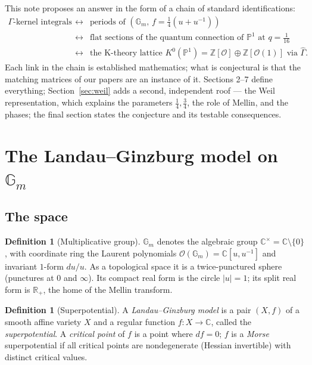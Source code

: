 \documentclass[11pt]{article}
\theoremstyle{definition}
\newtheorem{definition}[proposition]{Definition}
\theoremstyle{remark}
\newcommand{\R}{\mathbb{R}}
\newcommand{\C}{\mathbb{C}}
\newcommand{\Z}{\mathbb{Z}}
\newcommand{\Gm}{\mathbb{G}_m}
\newcommand{\PP}{\mathbb{P}}
\newcommand{\G}{\Gamma}
\begin{document}
This note proposes an answer in the form of a chain of standard
identifications:
\[
  \begin{array}{ccc}
  \text{$\G$-kernel integrals}
  & \longleftrightarrow &
  \text{periods of } (\Gm,\, f = \tfrac14(u+u^{-1})) \\[2pt]
  & \longleftrightarrow &
  \text{flat sections of the quantum connection of } \PP^1
  \text{ at } q = \tfrac1{16} \\[2pt]
  & \longleftrightarrow &
  \text{the K-theory lattice } K^0(\PP^1) = \Z[\mathcal O] \oplus
  \Z[\mathcal O(1)] \text{ via } \widehat\G.
  \end{array}
\]
Each link in the chain is established mathematics; what is
conjectural is that the matching matrices of our papers are an
instance of it. Sections 2--7 define everything;
Section~\ref{sec:weil} adds a second, independent roof --- the
Weil representation, which explains the parameters
$\tfrac14, \tfrac34$, the role of Mellin, and the phases; the
final section states the conjecture and its testable
consequences.

\section{The Landau--Ginzburg model on $\Gm$}

\subsection{The space}

\begin{definition}[Multiplicative group]
$\Gm$ denotes the algebraic group $\C^\times = \C \setminus \{0\}$,
with coordinate ring the Laurent polynomials
$\mathcal O(\Gm) = \C[u, u^{-1}]$ and invariant $1$-form $du/u$. As
a topological space it is a twice-punctured sphere (punctures at
$0$ and $\infty$). Its compact real form is the circle $|u| = 1$;
its split real form is $\R_+$, the home of the Mellin transform.
\end{definition}

\begin{definition}[Superpotential]
A \emph{Landau--Ginzburg model} is a pair $(X, f)$ of a smooth
affine variety $X$ and a regular function
$f \colon X \to \C$, called the \emph{superpotential}. A
\emph{critical point} of $f$ is a point where $df = 0$; $f$ is a
\emph{Morse} superpotential if all critical points are
nondegenerate (Hessian invertible) with distinct critical values.
\end{definition}
\end{document}
